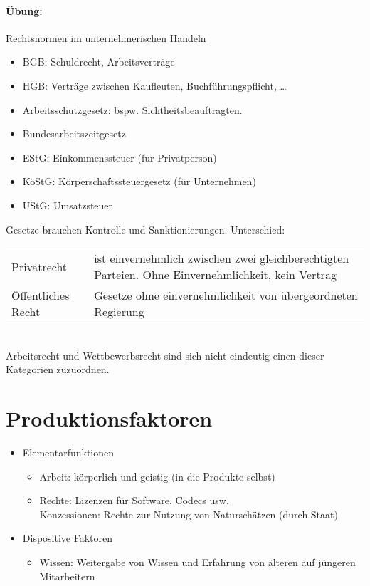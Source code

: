 \documentclass{scrreprt}
\begin{document}
\paragraph{Übung:} Rechtsnormen im unternehmerischen Handeln
\begin{itemize}
\item BGB: Schuldrecht, Arbeitsverträge
\item HGB: Verträge zwischen Kaufleuten, Buchführungspflicht, …
\item Arbeitsschutzgesetz: bspw. Sichtheitsbeauftragten.
\item Bundesarbeitszeitgesetz
\item EStG: Einkommenssteuer (fur Privatperson)
\item KöStG: Körperschaftssteuergesetz (für Unternehmen)
\item UStG: Umsatzsteuer
\end{itemize}
Gesetze brauchen Kontrolle und Sanktionierungen.
Unterschied:\\
\begin{tabular}{p{} p{}}
Privatrecht & ist einvernehmlich zwischen zwei gleichberechtigten Parteien. Ohne Einvernehmlichkeit, kein Vertrag\\
Öffentliches Recht & Gesetze ohne einvernehmlichkeit von übergeordneten Regierung
\end{tabular}\\
Arbeitsrecht und Wettbewerbsrecht sind sich nicht eindeutig einen dieser Kategorien zuzuordnen.

\section{Produktionsfaktoren}
\begin{itemize}
\item Elementarfunktionen
\begin{itemize}
\item Arbeit: körperlich und geistig (in die Produkte selbst)
\item Rechte: Lizenzen für Software, Codecs usw.\\
Konzessionen: Rechte zur Nutzung von Naturschätzen (durch Staat)
\end{itemize}
\item Dispositive Faktoren
\begin{itemize}
\item Wissen: Weitergabe von Wissen und Erfahrung von älteren auf jüngeren Mitarbeitern
\end{itemize}
\end{itemize}
\end{document}
